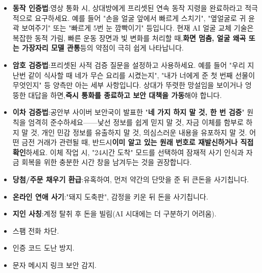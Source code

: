 \begin{itemize}
  \item \textbf{동작 인증법}:영상 통화 시, 상대방에게 프리셋된 연속 동작 지령을 완료하라고 적극적으로 요구하세요. 예를 들어 "손을 얼굴 앞에서 빠르게 스치기", "옆얼굴로 귀 윤곽 보여주기" 또는 "빠르게 5번 눈 깜빡이기" 등입니다. 현재 AI 얼굴 교체 기술은 복잡한 동적 가림, 빠른 운동 장면과 빛 변화를 처리할 때,\textbf{화면 멈춤, 얼굴 왜곡 또는 가장자리 모델 관통}등의 약점이 극히 쉽게 나타납니다.
  \item \textbf{암호 검증법}:프리셋된 사적 검증 질문을 설정하고 사용하세요. 예를 들어 "우리 지난번 같이 식사할 때 네가 무슨 요리를 시켰는지", "내가 너에게 준 첫 번째 선물이 무엇인지" 등 양측만 아는 세부 사항입니다. 상대가 뚜렷한 망설임을 보이거나 엉뚱한 대답을 하면,\textbf{즉시 통화를 종료하고 보안 대책을 가동}해야 합니다.
  \item \textbf{이차 검증법}:공안부 사이버 보안국이 발표한 "\textbf{네 가지 하지 말 것, 한 번 검증}" 원칙을 엄격히 준수하세요——낯선 정보를 쉽게 믿지 말 것, 자금 이체를 함부로 하지 말 것, 개인 민감 정보를 유출하지 말 것, 의심스러운 내용을 유포하지 말 것. 어떤 금전 거래가 관련될 때, 반드시\textbf{이미 알고 있는 원래 번호로 재발신하거나 직접 확인}하세요. 이체 작업 시, "24시간 도착" 모드를 선택하여 잠재적 사기 인식과 자금 회복을 위한 충분한 시간 창을 남겨두는 것을 권장합니다.
\end{itemize}


\begin{itemize}
  \item \textbf{당첨/주문 채우기 환급}:유혹하여, 먼저 약간의 단맛을 준 뒤 큰돈을 사기칩니다.
  \item \textbf{온라인 연애 사기}:"돼지 도축판", 감정을 키운 뒤 돈을 사기칩니다.
  \item \textbf{지인 사칭}:계정 탈취 후 돈을 빌림(AI 시대에는 더 구분하기 어려움).
\end{itemize}


\begin{itemize}
  \item 스팸 전화 차단.
  \item 인증 코드 도난 방지.
  \item 문자 메시지 링크 보안 감지.
\end{itemize}


